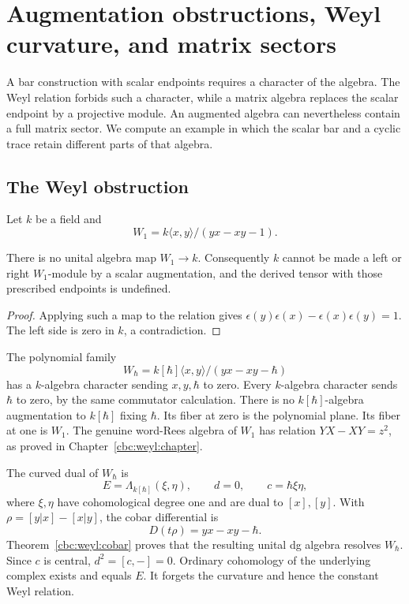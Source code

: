 \chapter{Augmentation obstructions, Weyl curvature, and matrix sectors}\label{chap:augmentation}

A bar construction with scalar endpoints requires a character of the algebra.
The Weyl relation forbids such a character, while a matrix algebra replaces the scalar endpoint by a projective module.
An augmented algebra can nevertheless contain a full matrix sector.
We compute an example in which the scalar bar and a cyclic trace retain different parts of that algebra.

\section{The Weyl obstruction}
Let $k$ be a field and
\[
 W_1=k\langle x,y\rangle/(yx-xy-1).
\]
\begin{theorem}\label{thm:weyl-noaug}
There is no unital algebra map $W_1\to k$.
Consequently $k$ cannot be made a left or right $W_1$-module by a scalar augmentation, and the derived tensor with those prescribed endpoints is undefined.
\end{theorem}
\begin{proof}
Applying such a map to the relation gives
$\epsilon(y)\epsilon(x)-\epsilon(x)\epsilon(y)=1$.
The left side is zero in $k$, a contradiction.
\end{proof}

The polynomial family
\[
 W_\hbar=k[\hbar]\langle x,y\rangle/(yx-xy-\hbar)
\]
has a $k$-algebra character sending $x,y,\hbar$ to zero.
Every $k$-algebra character sends $\hbar$ to zero, by the same commutator calculation.
There is no $k[\hbar]$-algebra augmentation to $k[\hbar]$ fixing $\hbar$.
Its fiber at zero is the polynomial plane.
Its fiber at one is $W_1$.
The genuine word-Rees algebra of $W_1$ has relation $YX-XY=z^2$, as proved in Chapter~\ref{cbc:weyl:chapter}.

The curved dual of $W_\hbar$ is
\[
 E=\Lambda_{k[\hbar]}(\xi,\eta),\qquad d=0,
 \qquad c=\hbar\xi\eta,
\]
where $\xi,\eta$ have cohomological degree one and are dual to $[x],[y]$.
With $\rho=[y|x]-[x|y]$, the cobar differential is
\[
 D(t\rho)=yx-xy-\hbar.
\]
Theorem~\ref{cbc:weyl:cobar} proves that the resulting unital dg algebra resolves $W_\hbar$.
Since $c$ is central, $d^2=[c,-]=0$.
Ordinary cohomology of the underlying complex exists and equals $E$.
It forgets the curvature and hence the constant Weyl relation.

